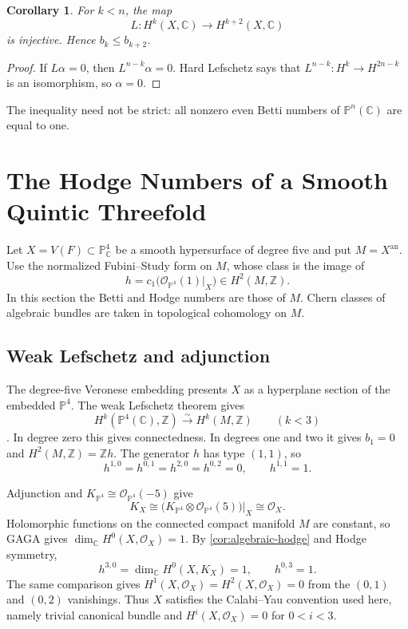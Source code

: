 \documentclass[11pt,reqno]{amsart}
\newtheorem{corollary}[theorem]{Corollary}
\theoremstyle{definition}
\theoremstyle{remark}
\newcommand{\C}{\mathbb{C}}
\newcommand{\Z}{\mathbb{Z}}
\newcommand{\PP}{\mathbb{P}}
\newcommand{\OO}{\mathcal{O}}
\newcommand{\Xan}{X^{\mathrm{an}}}
\begin{document}
\begin{corollary}
\label{cor:betti-monotone}
For $k<n$, the map
\[
L:H^k(X,\C)\longrightarrow H^{k+2}(X,\C)
\]
is injective. Hence $b_k\leq b_{k+2}$.
\end{corollary}

\begin{proof}
If $L\alpha=0$, then $L^{n-k}\alpha=0$. Hard Lefschetz says that
$L^{n-k}:H^k\to H^{2n-k}$ is an isomorphism, so $\alpha=0$.
\end{proof}

The inequality need not be strict: all nonzero even Betti numbers of
$\PP^n(\C)$ are equal to one.

\section{The Hodge Numbers of a Smooth Quintic Threefold}
\label{sec:quintic}

Let $X=V(F)\subset\PP^4_{\C}$ be a smooth hypersurface of degree five and
put $M=\Xan$. Use the normalized Fubini--Study form on $M$, whose class
is the image of
\[
h=c_1\bigl(\OO_{\PP^4}(1)|_X\bigr)\in H^2(M,\Z).
\]
In this section the Betti and Hodge numbers are those of $M$.
Chern classes of algebraic bundles are taken in topological cohomology
on $M$.

\subsection{Weak Lefschetz and adjunction}

The degree-five Veronese embedding presents $X$ as a hyperplane section
of the embedded $\PP^4$. The weak Lefschetz theorem gives
\[
H^k(\PP^4(\C),\Z)\xrightarrow{\sim}H^k(M,\Z)
\qquad(k<3)
\]
\cite[Ch.~1]{voisin2003hodge2}. In degree zero this gives connectedness.
In degrees one and two it gives $b_1=0$ and
$H^2(M,\Z)=\Z h$. The generator $h$ has type $(1,1)$, so
\[
h^{1,0}=h^{0,1}=h^{2,0}=h^{0,2}=0,\qquad h^{1,1}=1.
\]

Adjunction and $K_{\PP^4}\cong\OO_{\PP^4}(-5)$ give
\[
K_X
\cong\bigl(K_{\PP^4}\otimes\OO_{\PP^4}(5)\bigr)|_X
\cong\OO_X.
\]
Holomorphic functions on the connected compact manifold $M$ are constant,
so GAGA gives $\dim_{\C}H^0(X,\OO_X)=1$. By \cref{cor:algebraic-hodge}
and Hodge symmetry,
\[
h^{3,0}=\dim_{\C}H^0(X,K_X)=1,\qquad h^{0,3}=1.
\]
The same comparison gives $H^1(X,\OO_X)=H^2(X,\OO_X)=0$ from the
$(0,1)$ and $(0,2)$ vanishings. Thus $X$ satisfies the Calabi--Yau
convention used here, namely trivial canonical bundle and
$H^i(X,\OO_X)=0$ for $0<i<3$.
\end{document}
